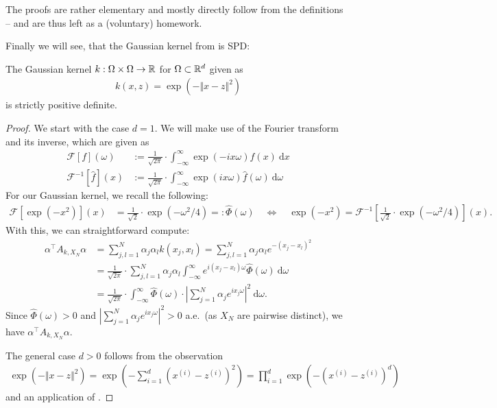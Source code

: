 The proofs are rather elementary and mostly directly follow from the definitions -- and are thus left as a (voluntary) homework.

Finally we will see, that the Gaussian kernel from  is SPD:

\begin{prop}
The Gaussian kernel $k: \Omega \times \Omega \rightarrow \mathbb{R}$ for $\Omega \subset \mathbb{R}^d$ given as
\begin{align*}
k(x, z) = \exp(-\Vert x - z \Vert^2)
\end{align*}
is strictly positive definite.
\end{prop}

\begin{proof}
We start with the case $d=1$.
We will make use of the Fourier transform and its inverse, which are given as
\begin{align*}
\mathcal{F}[f](\omega) &:= \frac{1}{\sqrt{2\pi}} \cdot \int_{-\infty}^\infty \exp(-ix\omega) f(x) ~ \mathrm{d}x \\
\mathcal{F}^{-1}[\hat{f}](x) &:= \frac{1}{\sqrt{2\pi}} \cdot \int_{-\infty}^\infty \exp(ix\omega) \hat{f}(\omega) ~ \mathrm{d}\omega
\end{align*}
For our Gaussian kernel, we recall the following:
\begin{align*}
\mathcal{F} \left[\exp(-x^2) \right](x) &=  \frac{1}{\sqrt{2}} \cdot \exp(-\omega^2 / 4) =: \hat{\Phi}(\omega) \quad \Leftrightarrow \quad
\exp(-x^2) = \mathcal{F}^{-1} \left[\frac{1}{\sqrt{2}} \cdot \exp(-\omega^2 / 4) \right](x).
\end{align*}
With this, we can straightforward compute:
\begin{align*}
\alpha^\top A_{k, X_N} \alpha &= \sum_{j, l=1}^N \alpha_j \alpha_l k(x_j, x_l) = \sum_{j, l=1}^N \alpha_j \alpha_l e^{-(x_j - x_l)^2} \\
&= \frac{1}{\sqrt{2\pi}} \cdot \sum_{j, l=1}^N \alpha_j \alpha_l \int_{-\infty}^\infty e^{i(x_j - x_l)\omega} \hat{\Phi}(\omega) ~ \mathrm{d}\omega \\
&= \frac{1}{\sqrt{2\pi}} \cdot \int_{-\infty}^\infty \hat{\Phi}(\omega) \cdot \left| \sum_{j=1}^N \alpha_j e^{ix_j \omega} \right|^2 ~ \mathrm{d}\omega.
\end{align*}
Since $\hat{\Phi}(\omega) > 0$ and $\left| \sum_{j=1}^N \alpha_j e^{ix_j \omega} \right|^2 > 0$ a.e.\ (as $X_N$ are pairwise distinct),
we have $\alpha^\top A_{k, X_N} \alpha$.

The general case $d>0$ follows from the observation
\begin{align*}
\exp(-\Vert x - z \Vert^2) = \exp(-\sum_{i=1}^d (x^{(i)} - z^{(i)})^2) = \prod_{i=1}^d \exp(-(x^{(i)} - z^{(i)})^d)
\end{align*}
and an application of .

\end{proof}

